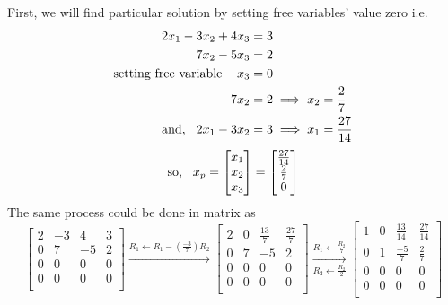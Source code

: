 \documentclass{article}
\begin{document}
First, we will find particular solution by setting free variables' value zero i.e.
\[
\begin{split}
  2x_1 - 3x_2 + 4x_3 &= 3 \\
  7x_2 - 5x_3 &= 2 \\
  \text{setting free variable\hspace{3mm}  } x_3 &= 0\\
  7x_2 &= 2 \implies x_2 = \frac{2}{7}\\
  \text{and,\hspace{3mm}} 2x_1 - 3x_2 &= 3 \implies x_1 = \frac{27}{14}\\ 
\end{split}
\]
\[
\text{so,\hspace{3mm}}x_p =
        \begin{bmatrix}
            x_1\\x_2\\x_3\\
        \end{bmatrix} = \begin{bmatrix}
                            \frac{27}{14}\\
                            \frac{2}{7}\\
                            0\\
                          \end{bmatrix}
\]
 The same process could be done in matrix as\\
 \[
 \left[\begin{array}{ccc|c}
     2 &-3 &4 &3\\
     0 &7 &-5 &2\\
     0 &0 &0 &0\\
     0 &0 &0 &0\\
  \end{array}\right]
  \xrightarrow{R_1\leftarrow R_1 -(\frac{-3}{7})R_2}
  \left[\begin{array}{ccc|c}
     2 &0 &\frac{13}{7} &\frac{27}{7}\\
     0 &7 &-5 &2\\
     0 &0 &0 &0\\
     0 &0 &0 &0\\
  \end{array}\right]
  \xrightarrow[R_2\leftarrow \frac{R_2}{2}]{R_1\leftarrow \frac{R_2}{7}}
  \left[\begin{array}{ccc|c}
    1 &0 &\frac{13}{14} &\frac{27}{14}\\
    0 &1 &\frac{-5}{7} &\frac{2}{7}\\
    0 &0 &0 &0\\
    0 &0 &0 &0\\
  \end{array}\right]
\]
\end{document}
